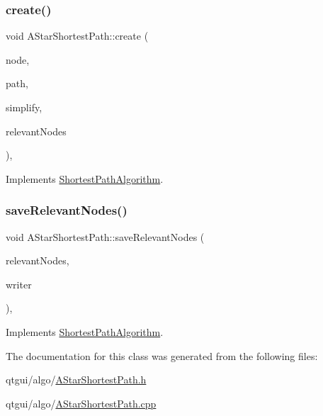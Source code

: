 \subsubsection{\texorpdfstring{create()}{create()}}
{\footnotesize\ttfamily void A\+Star\+Shortest\+Path\+::create (\begin{DoxyParamCaption}\item[{std\+::shared\+\_\+ptr$<$ \mbox{\hyperlink{class_node_data}{Node\+Data}} $>$}]{node,  }\item[{Q\+String}]{path,  }\item[{bool}]{simplify,  }\item[{const Q\+List$<$ std\+::shared\+\_\+ptr$<$ \mbox{\hyperlink{class_node_data}{Node\+Data}} $>$ $>$ \&}]{relevant\+Nodes }\end{DoxyParamCaption})\hspace{0.3cm}{\ttfamily [override]}, {\ttfamily [virtual]}}



Implements \mbox{\hyperlink{class_shortest_path_algorithm_a2d4fc30e24f6bf057111f632ea0633bf}{Shortest\+Path\+Algorithm}}.

\mbox{\label{class_a_star_shortest_path_ac75bc0ce3b80510e0f3170cb717c620c}} 
\subsubsection{\texorpdfstring{saveRelevantNodes()}{saveRelevantNodes()}}
{\footnotesize\ttfamily void A\+Star\+Shortest\+Path\+::save\+Relevant\+Nodes (\begin{DoxyParamCaption}\item[{const Q\+List$<$ std\+::shared\+\_\+ptr$<$ \mbox{\hyperlink{class_node_data}{Node\+Data}} $>$ $>$ \&}]{relevant\+Nodes,  }\item[{std\+::function$<$ void(\mbox{\hyperlink{classtypes_1_1_node_id}{types\+::\+Node\+Id}}, \mbox{\hyperlink{classtypes_1_1_node_id}{types\+::\+Node\+Id}}, double)$>$}]{writer }\end{DoxyParamCaption})\hspace{0.3cm}{\ttfamily [override]}, {\ttfamily [virtual]}}



Implements \mbox{\hyperlink{class_shortest_path_algorithm_ab53826557f9af1fe47d66c32d2f77b79}{Shortest\+Path\+Algorithm}}.



The documentation for this class was generated from the following files\+:\begin{DoxyCompactItemize}
\item 
qtgui/algo/\mbox{\hyperlink{_a_star_shortest_path_8h}{A\+Star\+Shortest\+Path.\+h}}\item 
qtgui/algo/\mbox{\hyperlink{_a_star_shortest_path_8cpp}{A\+Star\+Shortest\+Path.\+cpp}}\end{DoxyCompactItemize}
